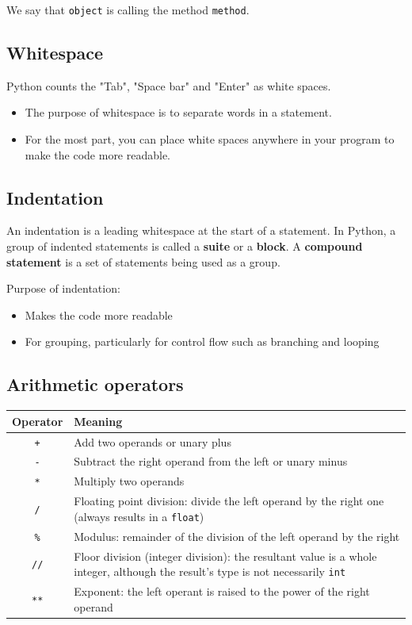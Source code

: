 \documentclass[11pt]{article}
\begin{document}
 \noindent We say that \texttt{object} is calling the method \texttt{method}.


\subsection{Whitespace}
\label{sec:org9250bce}
Python counts the "Tab", "Space bar" and "Enter" as white spaces.
\begin{itemize}
\item The purpose of whitespace is to separate words in a statement.
\item For the most part, you can place white spaces anywhere in your program to make the code more readable.
\end{itemize}

\subsection{Indentation}
\label{sec:org9432dd2}
An indentation is a leading whitespace at the start of a statement. In Python, a group of indented statements is called a \textbf{suite} or a \textbf{block}. A \textbf{compound statement} is a set of statements being used as a group.

Purpose of indentation:
\begin{itemize}
\item Makes the code more readable
\item For grouping, particularly for control flow such as branching and looping
\end{itemize}

\subsection{Arithmetic operators}
\label{sec:org183a09d}

\begin{center}
\begin{tabular}{|c|m{32em}|}
\hline
Operator & Meaning\\[0pt]
\hline
\texttt{+} & Add two operands or unary plus\\[0pt]
\hline
\texttt{-} & Subtract the right operand from the left or unary minus\\[0pt]
\hline
\texttt{*} & Multiply two operands\\[0pt]
\hline
\texttt{/} & Floating point division: divide the left operand by the right one (always results in a \texttt{float})\\[0pt]
\hline
\texttt{\%} & Modulus: remainder of the division of the left operand by the right\\[0pt]
\hline
\texttt{//} & Floor division (integer division): the resultant value is a whole integer, although the result's type is not necessarily \texttt{int}\\[0pt]
\hline
\texttt{**} & Exponent: the left operant is raised to the power of the right operand\\[0pt]
\hline
\end{tabular}
\end{center}
\end{document}
